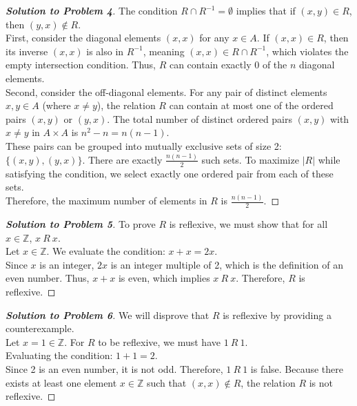 \documentclass[11pt, a4paper]{article}
\theoremstyle{definition}
\theoremstyle{remark}
\newcommand{\Z}{\mathbb{Z}}
\begin{document}
\begin{proof}[\textbf{Solution to Problem 4}]
The condition $R \cap R^{-1} = \emptyset$ implies that if $(x, y) \in R$, then $(y, x) \notin R$. \\
First, consider the diagonal elements $(x, x)$ for any $x \in A$. If $(x, x) \in R$, then its inverse $(x, x)$ is also in $R^{-1}$, meaning $(x, x) \in R \cap R^{-1}$, which violates the empty intersection condition. Thus, $R$ can contain exactly $0$ of the $n$ diagonal elements. \\
Second, consider the off-diagonal elements. For any pair of distinct elements $x, y \in A$ (where $x \neq y$), the relation $R$ can contain at most one of the ordered pairs $(x, y)$ or $(y, x)$. The total number of distinct ordered pairs $(x, y)$ with $x \neq y$ in $A \times A$ is $n^2 - n = n(n-1)$. \\
These pairs can be grouped into mutually exclusive sets of size 2: $\{(x, y), (y, x)\}$. There are exactly $\frac{n(n-1)}{2}$ such sets. To maximize $|R|$ while satisfying the condition, we select exactly one ordered pair from each of these sets. \\
Therefore, the maximum number of elements in $R$ is $\frac{n(n-1)}{2}$.
\end{proof}

\begin{proof}[\textbf{Solution to Problem 5}]
To prove $R$ is reflexive, we must show that for all $x \in \Z$, $x \ R \ x$. \\
Let $x \in \Z$. We evaluate the condition: $x + x = 2x$. \\
Since $x$ is an integer, $2x$ is an integer multiple of 2, which is the definition of an even number. Thus, $x + x$ is even, which implies $x \ R \ x$. Therefore, $R$ is reflexive.
\end{proof}

\begin{proof}[\textbf{Solution to Problem 6}]
We will disprove that $R$ is reflexive by providing a counterexample. \\
Let $x = 1 \in \Z$. For $R$ to be reflexive, we must have $1 \ R \ 1$. \\
Evaluating the condition: $1 + 1 = 2$. \\
Since 2 is an even number, it is not odd. Therefore, $1 \ R \ 1$ is false. Because there exists at least one element $x \in \Z$ such that $(x, x) \notin R$, the relation $R$ is not reflexive.
\end{proof}
\end{document}
